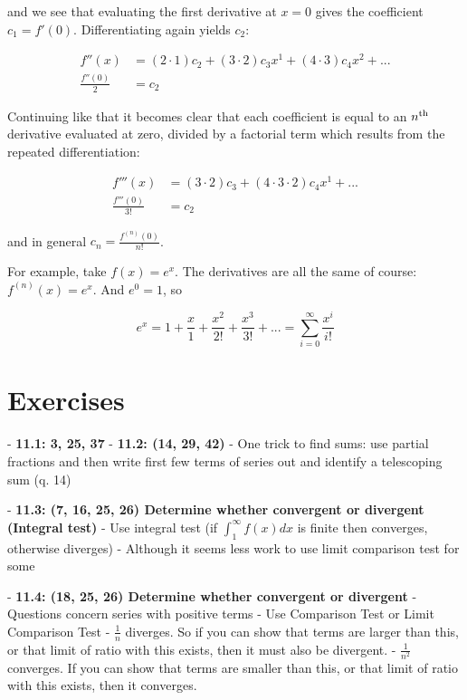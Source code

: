 and we see that evaluating the first derivative at $x=0$ gives the coefficient
$c_1 = f'(0)$. Differentiating again yields $c_2$:

\begin{align*}
f''(x) &= (2\cdot 1)c_2 + (3\cdot 2)c_3x^1 + (4\cdot 3)c_4x^2 + ... \\
\frac{f''(0)}{2} &= c_2
\end{align*}

Continuing like that it becomes clear that each coefficient is equal to an $n^{\text{th}}$ derivative evaluated at zero, divided by a factorial term which results from the repeated differentiation:

\begin{align*}
f'''(x) &= (3\cdot2)c_3 + (4\cdot3\cdot2)c_4x^1 + ... \\
\frac{f'''(0)}{3!} &= c_2
\end{align*}

and in general $c_n = \frac{f^{(n)}(0)}{n!}$.

For example, take $f(x) = e^x$. The derivatives are all the same of course: $f^{(n)}(x) = e^x$. And $e^0 = 1$, so

$$
e^x = 1 + \frac{x}{1} + \frac{x^2}{2!} + \frac{x^3}{3!} + ... = \sum_{i=0}^\infty \frac{x^i}{i!}
$$



\section{Exercises}

- \textbf{11.1: 3, 25, 37}
- \textbf{11.2: (14, 29, 42)}
    - One trick to find sums: use partial fractions and then write first few terms of series out and identify a telescoping sum (q. 14)

- \textbf{11.3: (7, 16, 25, 26) Determine whether convergent or divergent (Integral test)}
    - Use integral test (if $\int_1^\infty f(x) dx$ is finite then converges, otherwise diverges)
    - Although it seems less work to use limit comparison test for some

- \textbf{11.4: (18, 25, 26) Determine whether convergent or divergent}
    - Questions concern series with positive terms
    - Use Comparison Test or Limit Comparison Test
    - $\frac{1}{n}$ diverges. So if you can show that terms are larger than this, or that limit of ratio with this exists, then it must also be divergent.
    - $\frac{1}{n^2}$ converges. If you can show that terms are smaller than this, or that limit of ratio with this exists, then it converges.

